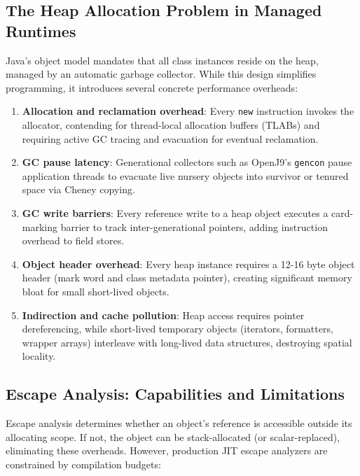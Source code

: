 \documentclass[12pt,a4paper]{article}
\begin{document}
\subsection{The Heap Allocation Problem in Managed Runtimes}

Java's object model mandates that all class instances reside on the heap, managed by an automatic garbage collector. While this design simplifies programming, it introduces several concrete performance overheads:

\begin{enumerate}
  \item \textbf{Allocation and reclamation overhead}: Every \texttt{new} instruction invokes the allocator, contending for thread-local allocation buffers (TLABs) and requiring active GC tracing and evacuation for eventual reclamation.
  \item \textbf{GC pause latency}: Generational collectors such as OpenJ9's \texttt{gencon} pause application threads to evacuate live nursery objects into survivor or tenured space via Cheney copying.
  \item \textbf{GC write barriers}: Every reference write to a heap object executes a card-marking barrier to track inter-generational pointers, adding instruction overhead to field stores.
  \item \textbf{Object header overhead}: Every heap instance requires a 12-16 byte object header (mark word and class metadata pointer), creating significant memory bloat for small short-lived objects.
  \item \textbf{Indirection and cache pollution}: Heap access requires pointer dereferencing, while short-lived temporary objects (iterators, formatters, wrapper arrays) interleave with long-lived data structures, destroying spatial locality.
\end{enumerate}

\subsection{Escape Analysis: Capabilities and Limitations}

Escape analysis determines whether an object's reference is accessible outside its allocating scope. If not, the object can be stack-allocated (or scalar-replaced), eliminating these overheads. However, production JIT escape analyzers are constrained by compilation budgets:
\end{document}
